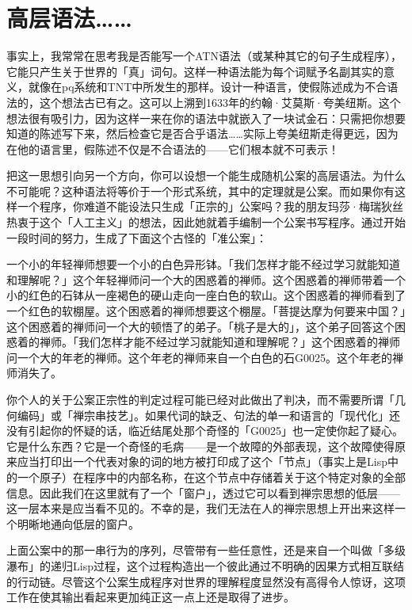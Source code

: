\documentclass[
  12pt,
  twoside,
  openright,
  oldfontcommands,
]{memoir}
\newenvironment{fsquote}{%
  \begin{mdframed}[style=gebquote]\kaitifamily\small%
}{%
  \end{mdframed}%
}
\begin{document}
\section{高层语法\ldots\ldots{}}

事实上，我常常在思考我是否能写一个ATN语法（或某种其它的句子生成程序），它能只产生关于世界的「真」词句。这样一种语法能为每个词赋予名副其实的意义，就像在pq系统和TNT中所发生的那样。设计一种语言，使假陈述成为不合语法的，这个想法古已有之。这可以上溯到1633年的约翰·艾莫斯·夸美纽斯。这个想法很有吸引力，因为这样一来在你的语法中就嵌入了一块试金石：只需把你想要知道的陈述写下来，然后检查它是否合乎语法\ldots\ldots 实际上夸美纽斯走得更远，因为在他的语言里，假陈述不仅是不合语法的------它们根本就不可表示！

把这一思想引向另一个方向，你可以设想一个能生成随机公案的高层语法。为什么不可能呢？这种语法将等价于一个形式系统，其中的定理就是公案。而如果你有这样一个程序，你难道不能设法只生成「正宗的」公案吗？我的朋友玛莎·梅瑞狄丝热衷于这个「人工主义」的想法，因此她就着手编制一个公案书写程序。通过开始一段时间的努力，生成了下面这个古怪的「准公案」：

\begin{fsquote}
一个小的年轻禅师想要一个小的白色异形钵。「我们怎样才能不经过学习就能知道和理解呢？」这个年轻禅师问一个大的困惑着的禅师。这个困惑着的禅师带着一个小的红色的石钵从一座褐色的硬山走向一座白色的软山。这个困惑着的禅师看到了一个红色的软棚屋。这个困惑着的禅师想要这个棚屋。「菩提达摩为何要来中国？」这个困惑着的禅师问一个大的顿悟了的弟子。「桃子是大的」，这个弟子回答这个困惑着的禅师。「我们怎样才能不经过学习就能知道和理解呢？」这个困惑着的禅师问一个大的年老的禅师。这个年老的禅师来自一个白色的石G0025。这个年老的禅师消失了。
\end{fsquote}

你个人的关于公案正宗性的判定过程可能已经对此做出了判决，而不需要所谓「几何编码」或「禅宗串技艺」。如果代词的缺乏、句法的单一和语言的「现代化」还没有引起你的怀疑的话，临近结尾处那个奇怪的「G0025」也一定使你起了疑心。它是什么东西？它是一个奇怪的毛病------是一个故障的外部表现，这个故障使得原来应当打印出一个代表对象的词的地方被打印成了这个「节点」（事实上是Lisp中的一个原子）在程序中的内部名称，在这个节点中存储着关于这个特定对象的全部信息。因此我们在这里就有了一个「窗户」，透过它可以看到禅宗思想的低层------这一层本来是应当看不见的。不幸的是，我们无法在人的禅宗思想上开出来这样一个明晰地通向低层的窗户。

上面公案中的那一串行为的序列，尽管带有一些任意性，还是来自一个叫做「多级瀑布」的递归Lisp过程，这个过程构造出一个彼此通过不明确的因果方式相互联结的行动链。尽管这个公案生成程序对世界的理解程度显然没有高得令人惊讶，这项工作在使其输出看起来更加纯正这一点上还是取得了进步。
\end{document}
